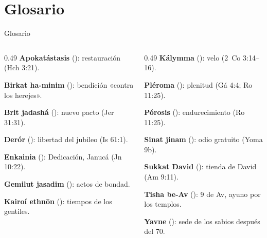 \section{Glosario}
\begin{frame}{Glosario}
\begin{columns}[t,onlytextwidth]
\begin{column}{0.49\textwidth}\scriptsize
\textbf{Apokatástasis} (): restauración (Hch 3:21).\par\smallskip
\textbf{Birkat ha-minim} (): bendición «contra los herejes».\par\smallskip
\textbf{Brit jadashá} (): nuevo pacto (Jer 31:31).\par\smallskip
\textbf{Derór} (): libertad del jubileo (Is 61:1).\par\smallskip
\textbf{Enkainia} (): Dedicación, Janucá (Jn 10:22).\par\smallskip
\textbf{Gemilut jasadim} (): actos de bondad.\par\smallskip
\textbf{Kairoí ethnōn} (): tiempos de los gentiles.
\end{column}
\begin{column}{0.49\textwidth}\scriptsize
\textbf{Kálymma} (): velo (2~Co 3:14--16).\par\smallskip
\textbf{Pléroma} (): plenitud (Gá 4:4; Ro 11:25).\par\smallskip
\textbf{Pórosis} (): endurecimiento (Ro 11:25).\par\smallskip
\textbf{Sinat jinam} (): odio gratuito (Yoma 9b).\par\smallskip
\textbf{Sukkat David} (): tienda de David (Am 9:11).\par\smallskip
\textbf{Tisha be-Av} (): 9 de Av, ayuno por los templos.\par\smallskip
\textbf{Yavne} (): sede de los sabios después del 70.
\end{column}
\end{columns}
\end{frame}

